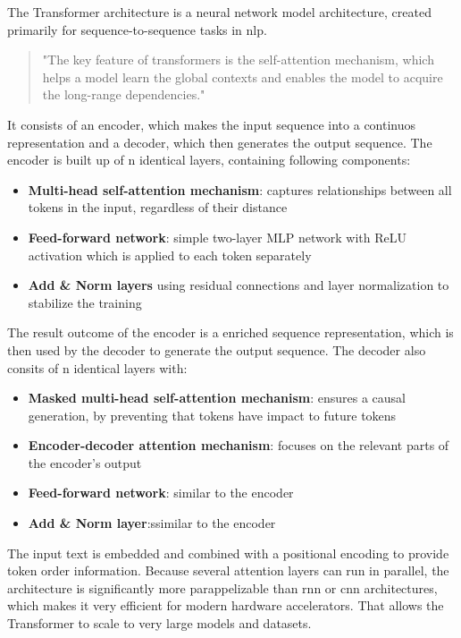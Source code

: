 \documentclass[conference]{IEEEtran}
\begin{document}
  The Transformer architecture is a neural network model architecture, created primarily for sequence-to-sequence tasks in \ac{nlp}. 
  \begin{quote}
    "The key feature of transformers is the self-attention mechanism, which helps a model learn the global contexts and enables the model to acquire the long-range dependencies." \cite{vit-state-challenges}
  \end{quote}
  It consists of an encoder, which makes the input sequence into a continuos representation and a decoder, which then generates the output sequence. The encoder is built up of n identical layers, containing following components:
  \begin{itemize}
    \item \textbf{Multi-head self-attention mechanism}: captures relationships between all tokens in the input, regardless of their distance
    \item \textbf{Feed-forward network}: simple two-layer MLP network with ReLU activation which is applied to each token separately
    \item \textbf{Add \& Norm layers} using residual connections and layer normalization to stabilize the training
  \end{itemize}
  The result outcome of the encoder is a enriched sequence representation, which is then used by the decoder to generate the output sequence. The decoder also consits of n identical layers with:
  \begin{itemize}
    \item \textbf{Masked multi-head self-attention mechanism}: ensures a causal generation, by preventing that tokens have impact to future tokens
    \item \textbf{Encoder-decoder attention mechanism}: focuses on the relevant parts of the encoder's output
    \item \textbf{Feed-forward network}: similar to the encoder
    \item \textbf{Add \& Norm layer}:ssimilar to the encoder
  \end{itemize}
  The input text is embedded and combined with a positional encoding to provide token order information. Because several attention layers can run in parallel, the architecture is significantly more parappelizable than \ac{rnn} or \ac{cnn} architectures, which makes it very efficient for modern hardware accelerators. That allows the Transformer to scale to very large models and datasets. \cite{transformer2017}
\end{document}
